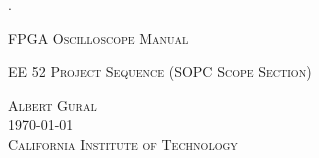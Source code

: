 \documentclass[letterpaper,oneside,10pt]{report}
\begin{document}








\begin{titlepage}

\begin{center}

.

\vspace{5cm}

{\LARGE \textsc{FPGA Oscilloscope Manual}}\\

\vspace{0.5cm}

{\normalsize \textsc{EE 52 Project Sequence (SOPC Scope Section)}}

\vspace{6cm}

{\large \textsc{Albert Gural}}\\

\vspace{0.5cm}
\textsc{\today}\\ %


\vspace{4cm}
{\Large \textsc{California Institute of Technology}}\\

\end{center}

\end{titlepage}
\end{document}
